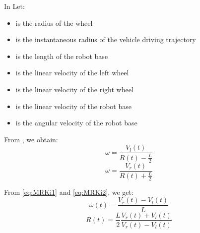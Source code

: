 In \textbf{\figureautorefname{ \ref{fig:Differential Drive Kinematic Model}}} Let:
\begin{itemize}
	\item { is the radius of the wheel}
	\item { is the instantaneous radius of the vehicle driving trajectory}
	\item { is the length of the robot base}
	\item { is the linear velocity of the left wheel}
	\item { is the linear velocity of the right wheel}
	\item { is the linear velocity of the robot base}
	\item {\makebox[1cm]{\(\omega\)\hfill} is the angular velocity of the robot base}
	
\end{itemize}

From \textbf{\figureautorefname{ \ref{fig:Differential Drive Kinematic Model}}}, we obtain:
\begin{equation} \label{eq:MRKi1}
\omega = \frac{V_l(t)}{R(t)-\frac{L}{2}}
\end{equation}
\begin{equation} \label{eq:MRKi2}
\omega = \frac{V_r(t)}{R(t)+\frac{L}{2}}
\end{equation}
\par

From \ref{eq:MRKi1} and \ref{eq:MRKi2}, we get:
\begin{equation} \label{eq:MRKi3}
\omega(t) = \frac{V_r(t)-V_l(t)}{L}
\end{equation}
\begin{equation} \label{eq:MRKi4}
R(t) = \frac{L}{2} \frac{V_r(t)+V_l(t)}{V_r(t)-V_l(t)}
\end{equation}

